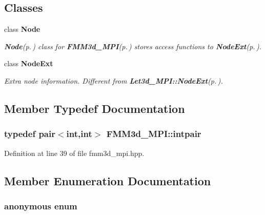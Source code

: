 \subsection*{Classes}
\begin{CompactItemize}
\item 
class {\bf Node}
\begin{CompactList}\small\item\em {\bf Node}{\rm (p.\,\pageref{classFMM3d__MPI_1_1Node})} class for {\bf FMM3d\_\-MPI}{\rm (p.\,\pageref{classFMM3d__MPI})} stores access functions to {\bf Node\-Ext}{\rm (p.\,\pageref{classFMM3d__MPI_1_1NodeExt})}. \item\end{CompactList}\item 
class {\bf Node\-Ext}
\begin{CompactList}\small\item\em Extra node information. Different from {\bf Let3d\_\-MPI::Node\-Ext}{\rm (p.\,\pageref{classLet3d__MPI_1_1NodeExt})}. \item\end{CompactList}\end{CompactItemize}


\subsection{Member Typedef Documentation}
\subsubsection{\setlength{\rightskip}{0pt plus 5cm}typedef pair$<$int,int$>$ {\bf FMM3d\_\-MPI::intpair}}\label{classFMM3d__MPI_516fcca2e14cd2e14fd71db54824f696_516fcca2e14cd2e14fd71db54824f696}




Definition at line 39 of file fmm3d\_\-mpi.hpp.

\subsection{Member Enumeration Documentation}
\subsubsection{\setlength{\rightskip}{0pt plus 5cm}anonymous enum}\label{classFMM3d__MPI_dca29a1140aadadfd92b34a02fa516ef_dca29a1140aadadfd92b34a02fa516ef}


